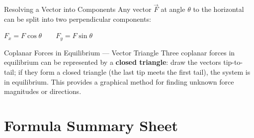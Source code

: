 \begin{formulabox}{Resolving a Vector into Components}
Any vector $\vec{F}$ at angle $\theta$ to the horizontal can be split into two perpendicular components:
\begin{center}
\Large $F_x = F\cos\theta \qquad F_y = F\sin\theta$
\end{center}

\begin{center}
\end{center}
\end{formulabox}

\begin{keybox}{Coplanar Forces in Equilibrium — Vector Triangle}
Three coplanar forces in equilibrium can be represented by a \textbf{closed triangle}: draw the vectors tip-to-tail; if they form a closed triangle (the last tip meets the first tail), the system is in equilibrium. This provides a graphical method for finding unknown force magnitudes or directions.
\end{keybox}

\section{Formula Summary Sheet}

